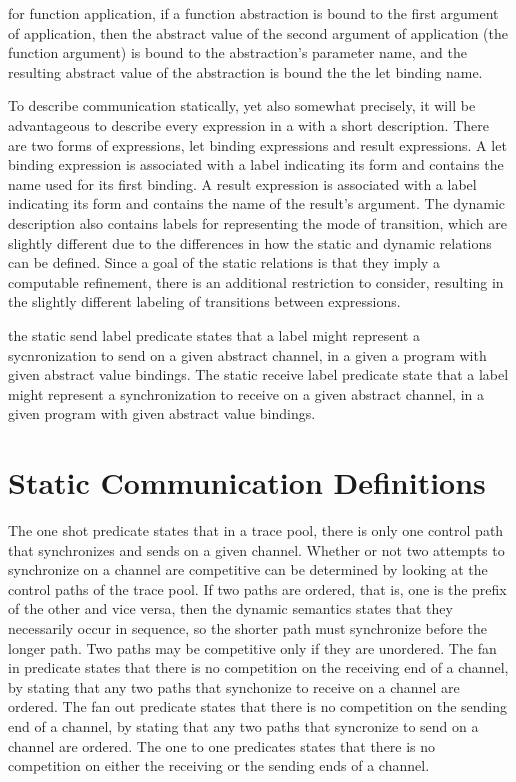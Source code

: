 \documentclass{article}
\begin{document}
for function application, if a function abstraction is bound to the first argument of
application, then the abstract value of the second argument of application (the function
argument) is bound to the abstraction's parameter name, and the resulting abstract value of the
abstraction is bound the the let binding name.

To describe communication statically, yet also somewhat precisely, it will be advantageous to
describe every expression in a with a short description.  There are two forms of expressions,
let binding expressions and result expressions.  A let binding expression is associated with a
label indicating its form and contains the name used for its first binding. A result
expression is associated with a label indicating its form and contains the name of the result's
argument.  The dynamic description also contains labels for representing the mode of
transition, which are slightly different due to the differences in how the static and dynamic
relations can be defined.  Since a goal of the static relations is that they imply a computable
refinement, there is an additional restriction to consider, resulting in the slightly different
labeling of transitions between expressions.    

the static send label predicate states that a label might represent a sycnronization to send on
a given abstract channel, in a given a program with given abstract value bindings.  The static
receive label predicate state that a label might represent a synchronization to receive on a
given abstract channel, in a given program with given abstract value bindings. 

\section{Static Communication Definitions}

The one shot predicate states that in a trace pool, there is only one control path that
synchronizes and sends on a given channel. Whether or not two attempts to synchronize on a
channel are competitive can be determined by
looking at the control paths of the trace pool. If two paths are ordered, that is, one is the
prefix of the other and vice versa, then the dynamic semantics states that they necessarily
occur in sequence, so the shorter path must synchronize before the longer path. Two paths may
be competitive only if they are unordered. The fan in predicate states that there is no
competition on the receiving end of a channel, by stating that any two paths that synchonize to
receive on a channel are ordered. The fan out predicate states that there is no competition on
the sending end of a channel, by stating that any two paths that syncronize to send on a
channel are ordered. The one to one predicates states that there is no competition on either
the receiving or the sending ends of a channel. 
\end{document}
